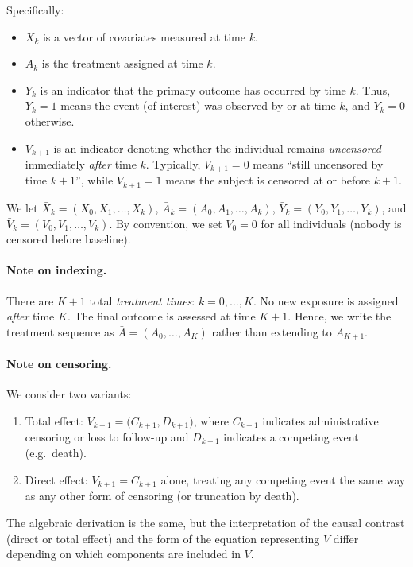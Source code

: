 Specifically:

\begin{itemize}
    \item \(X_k\) is a vector of covariates measured at time \(k\).
    \item \(A_k\) is the treatment assigned at time \(k\).
    \item \(Y_k\) is an indicator that the primary outcome has occurred by time \(k\). Thus, \(Y_k = 1\) means the event (of interest) was observed by or at time \(k\), and \(Y_k = 0\) otherwise.
    \item \(V_{k+1}\) is an indicator denoting whether the individual remains \emph{uncensored} immediately \emph{after} time \(k\). 
    Typically, \(V_{k+1} = 0\) means “still uncensored by time \(k+1\)”, while \(V_{k+1} = 1\) means the subject is censored at or before \(k+1\).
\end{itemize}

We let \(\bar{X}_k = (X_0, X_1, \ldots, X_k)\), \(\bar{A}_k = (A_0, A_1, \ldots, A_k)\), \(\bar{Y}_k=(Y_0, Y_1,\ldots, Y_k)\), and \(\bar{V}_k=(V_0, V_1, \ldots,V_k)\).  By convention, we set \(V_0 = 0\) for all individuals (nobody is censored before baseline).  

\paragraph{Note on indexing.}
There are \(K+1\) total \emph{treatment times}: \(k=0,\dots,K\).  No new exposure is assigned \emph{after} time \(K\).  The final outcome is assessed at time \(K+1\). Hence, we write the treatment sequence as \(\bar{A} = (A_0,\dots,A_K)\) rather than extending to \(A_{K+1}\).  
\paragraph{Note on censoring.}
We consider two variants:
\begin{enumerate}
  \item Total effect: \(V_{k+1} = \bigl(C_{k+1}, D_{k+1}\bigr)\), where \(C_{k+1}\) indicates administrative censoring or loss to follow-up and \(D_{k+1}\) indicates a competing event (e.g.\ death).
  \item Direct effect: \(V_{k+1} = C_{k+1}\) alone, treating any competing event the same way as any other form of censoring (or truncation by death).
\end{enumerate}
The algebraic derivation is the same, but the interpretation of the causal contrast (direct or total effect) and the form of the equation representing \(V\) differ depending on which components are included in \(V\).  

